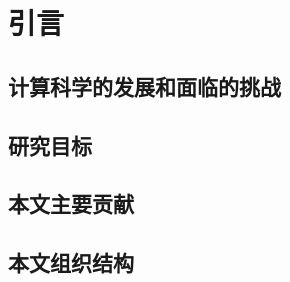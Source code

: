 
\chapter{引言}
\label{chap:intro1}

\section{计算科学的发展和面临的挑战}

\section{研究目标}

\section{本文主要贡献}

\section{本文组织结构}